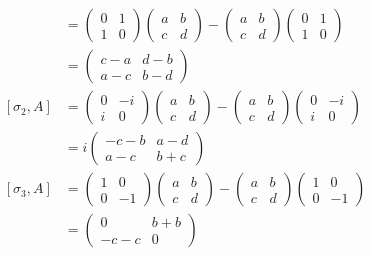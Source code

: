 \documentclass{article}
\begin{document}
\begin{align*}
[ \sigma_1 , A ] 
	& = \left( \begin{matrix} 0 & 1 \\ 1 & 0 \end{matrix} \right)
	\left( \begin{matrix} a & b \\ c & d \end{matrix} \right)
	- 
	\left( \begin{matrix} a & b \\ c & d \end{matrix} \right)
	\left( \begin{matrix} 0 & 1 \\ 1 & 0 \end{matrix} \right)\\
& = \left( \begin{matrix} c - a & d - b \\ a - c & b - d\end{matrix} \right)\\
[ \sigma_2 , A ]
	& = \left( \begin{matrix} 0 & -i \\ i & 0 \end{matrix} \right)
	\left( \begin{matrix} a & b \\ c & d \end{matrix} \right)
	- 
	\left( \begin{matrix} a & b \\ c & d \end{matrix} \right)
	\left( \begin{matrix} 0 & -i \\ i & 0 \end{matrix} \right)\\
& = i \left( \begin{matrix} - c - b & a - d \\ a - c & b + c \end{matrix} \right)\\
[ \sigma_3, A ]
	& = \left( \begin{matrix} 1 & 0 \\ 0 & -1 \end{matrix} \right)
	\left( \begin{matrix} a & b \\ c & d \end{matrix} \right)
	- 
	\left( \begin{matrix} a & b \\ c & d \end{matrix} \right)
	\left( \begin{matrix} 1 & 0 \\ 0 & -1 \end{matrix} \right)\\
& = \left( \begin{matrix} 0 & b + b \\ - c - c & 0 \end{matrix} \right)\\
\end{align*}
\end{document}
